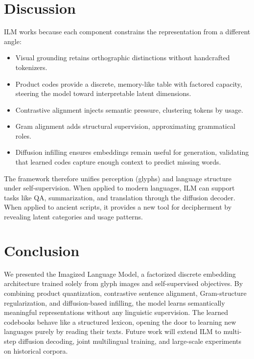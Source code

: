 \documentclass[10pt,twocolumn]{article}
\begin{document}
\section{Discussion}
ILM works because each component constrains the representation from a different angle:
\begin{itemize}
    \item Visual grounding retains orthographic distinctions without handcrafted tokenizers.
    \item Product codes provide a discrete, memory-like table with factored capacity, steering the model toward interpretable latent dimensions.
    \item Contrastive alignment injects semantic pressure, clustering tokens by usage.
    \item Gram alignment adds structural supervision, approximating grammatical roles.
    \item Diffusion infilling ensures embeddings remain useful for generation, validating that learned codes capture enough context to predict missing words.
\end{itemize}
The framework therefore unifies perception (glyphs) and language structure under self-supervision. When applied to modern languages, ILM can support tasks like QA, summarization, and translation through the diffusion decoder. When applied to ancient scripts, it provides a new tool for decipherment by revealing latent categories and usage patterns.

\section{Conclusion}
We presented the Imagized Language Model, a factorized discrete embedding architecture trained solely from glyph images and self-supervised objectives. By combining product quantization, contrastive sentence alignment, Gram-structure regularization, and diffusion-based infilling, the model learns semantically meaningful representations without any linguistic supervision. The learned codebooks behave like a structured lexicon, opening the door to learning new languages purely by reading their texts. Future work will extend ILM to multi-step diffusion decoding, joint multilingual training, and large-scale experiments on historical corpora.
\end{document}
